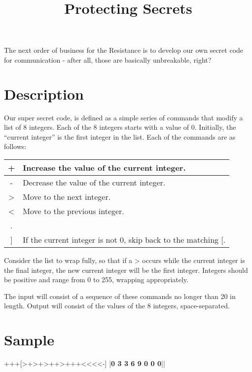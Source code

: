 \documentclass{../codeproblem}
\begin{document}
\title{Protecting Secrets}

\begin{flavor}
  The next order of business for the Resistance is to develop our own secret code for communication - after all, those are basically unbreakable, right?
\end{flavor}

\section*{Description}
Our super secret code, is defined as a simple series of commands that modify a list of 8 integers. Each of the 8 integers starts with a value of 0. Initially, the ``current integer'' is the first integer in the list.  Each of the commands are as follows:

\begin{center}
\begin{tabular}{| c | l |}\hline
  + & Increase the value of the current integer.\\\hline
  - & Decrease the value of the current integer.\\\hline
  > & Move to the next integer.\\\hline
  < & Move to the previous integer.\\\hline
  [ & If the current integer is 0, skip to after the matching ].\\\hline
  ] & If the current integer is not 0, skip back to the matching [.\\\hline
\end{tabular}
\end{center}

Consider the list to wrap fully, so that if a > occurs while the current integer is the final integer, the new current integer will be the first integer. Integers should be positive and range from 0 to 255, wrapping appropriately.

The input will consist of a sequence of these commands no longer than 20 in length. Output will consist of the values of the 8 integers, space-separated.

\section*{Sample}
\begin{example}
+++[>+>+>++>+++<<<<-]
|\textbf{0 3 3 6 9 0 0 0}||\end{example}
\end{document}
